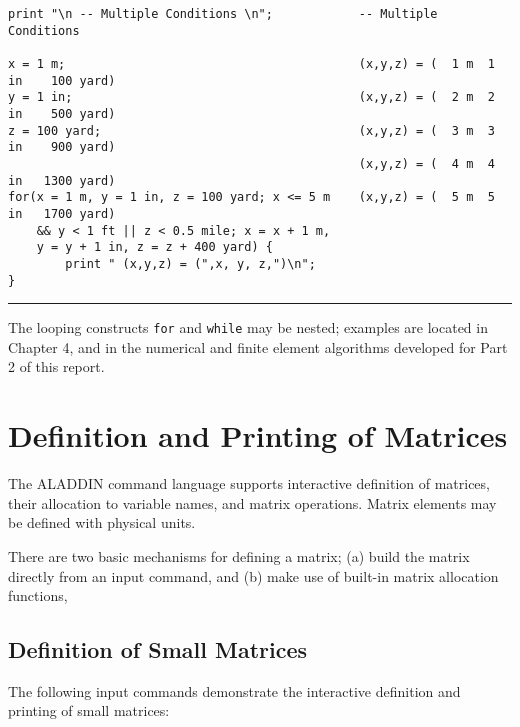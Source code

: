 \begin{footnotesize}
\begin{verbatim}
print "\n -- Multiple Conditions \n";            -- Multiple Conditions

x = 1 m;                                         (x,y,z) = (  1 m  1 in    100 yard)
y = 1 in;                                        (x,y,z) = (  2 m  2 in    500 yard)
z = 100 yard;                                    (x,y,z) = (  3 m  3 in    900 yard)
                                                 (x,y,z) = (  4 m  4 in   1300 yard)
for(x = 1 m, y = 1 in, z = 100 yard; x <= 5 m    (x,y,z) = (  5 m  5 in   1700 yard)
    && y < 1 ft || z < 0.5 mile; x = x + 1 m,
    y = y + 1 in, z = z + 400 yard) {
        print " (x,y,z) = (",x, y, z,")\n";
}

\end{verbatim}
\rule{6.25 in}{0.035 in}
\end{footnotesize}

\vspace{0.15 in}\noindent
The looping constructs {\tt for} and {\tt while} may be nested;
examples are located in Chapter 4, and in the numerical and finite element
algorithms developed for Part 2 of this report.

\vspace{0.15 in}
\section{Definition and Printing of Matrices}

\vspace{0.15 in}
\noindent\hspace{0.5 in}
The ALADDIN command language supports interactive definition of matrices,
their allocation to variable names, and matrix operations.
Matrix elements may be defined with physical units.

\vspace{0.15 in}
\noindent\hspace{0.5 in}
There are two basic mechanisms for defining a matrix;
(a) build the matrix directly from an input command,
and (b) make use of built-in matrix allocation functions,


\subsection{Definition of Small Matrices}

\vspace{0.15 in}
\noindent\hspace{0.5 in}
The following input commands demonstrate the
interactive definition and printing of small matrices:
 
